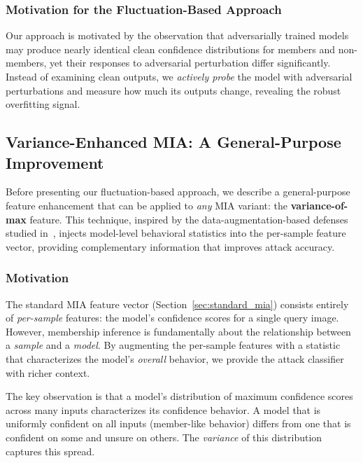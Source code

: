 \documentclass[conference]{IEEEtran}
\begin{document}
\subsubsection{Motivation for the Fluctuation-Based Approach}

Our approach is motivated by the observation that adversarially trained models may produce nearly identical clean confidence distributions for members and non-members, yet their responses to adversarial perturbation differ significantly. Instead of examining clean outputs, we \textit{actively probe} the model with adversarial perturbations and measure how much its outputs change, revealing the robust overfitting signal.


\subsection{Variance-Enhanced MIA: A General-Purpose Improvement}
\label{sec:variance_mia}

Before presenting our fluctuation-based approach, we describe a general-purpose feature enhancement that can be applied to \textit{any} MIA variant: the \textbf{variance-of-max} feature. This technique, inspired by the data-augmentation-based defenses studied in~\cite{salem2019ml}, injects model-level behavioral statistics into the per-sample feature vector, providing complementary information that improves attack accuracy.

\subsubsection{Motivation}

The standard MIA feature vector (Section~\ref{sec:standard_mia}) consists entirely of \textit{per-sample} features: the model's confidence scores for a single query image. However, membership inference is fundamentally about the relationship between a \textit{sample} and a \textit{model}. By augmenting the per-sample features with a statistic that characterizes the model's \textit{overall} behavior, we provide the attack classifier with richer context.

The key observation is that a model's distribution of maximum confidence scores across many inputs characterizes its confidence behavior. A model that is uniformly confident on all inputs (member-like behavior) differs from one that is confident on some and unsure on others. The \textit{variance} of this distribution captures this spread.
\end{document}
